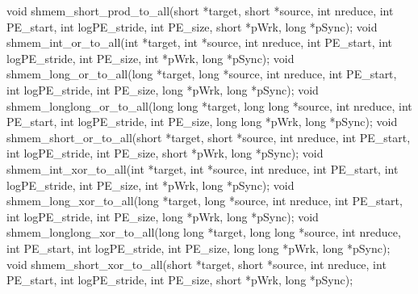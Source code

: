 void shmem_short_prod_to_all(short *target, short *source, int nreduce, int PE_start, int logPE_stride, int PE_size, short *pWrk, long *pSync);
void shmem_int_or_to_all(int *target, int *source, int nreduce, int PE_start, int logPE_stride, int PE_size, int *pWrk, long *pSync);
void shmem_long_or_to_all(long *target, long *source, int nreduce, int PE_start, int logPE_stride, int PE_size, long *pWrk, long *pSync);
void shmem_longlong_or_to_all(long long *target, long long *source, int nreduce, int PE_start, int logPE_stride, int PE_size, long long *pWrk, long *pSync);
void shmem_short_or_to_all(short *target, short *source, int nreduce, int PE_start, int logPE_stride, int PE_size, short *pWrk, long *pSync);
void shmem_int_xor_to_all(int *target, int *source, int nreduce, int PE_start, int logPE_stride, int PE_size, int *pWrk, long *pSync);
void shmem_long_xor_to_all(long *target, long *source, int nreduce, int PE_start, int logPE_stride, int PE_size, long *pWrk, long *pSync);
void shmem_longlong_xor_to_all(long long *target, long long *source, int nreduce, int PE_start, int logPE_stride, int PE_size, long long *pWrk, long *pSync);
void shmem_short_xor_to_all(short *target, short *source, int nreduce, int PE_start, int logPE_stride, int PE_size, short *pWrk, long *pSync); %

\synF %

